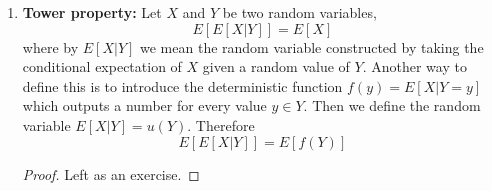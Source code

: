 \begin{itemize}
\begin{enumerate}
\begin{proof}
\begin{align*}
    \end{align*}
    \end{proof}
    \item {\bf Tower property:} Let $X$ and $Y$ be two random variables,  
   \begin{equation*}
   E[E[X|Y]] = E[X]
   \end{equation*}
   where by $E[X|Y]$ we mean the random variable constructed by taking the conditional expectation of $X$ given a random value of $Y$. Another way to define this is to introduce the deterministic function  $f(y) = E[X|Y=y]$ which outputs a number for every value $y \in Y$. Then we define the random variable $E[X|Y] = u(Y)$.  Therefore
   \begin{equation*}
   E[E[X|Y]]  = E[f(Y)] 
   \end{equation*}
   \begin{proof}
   Left as an exercise. 
   \end{proof}
  \end{enumerate}
  \end{itemize}
  
